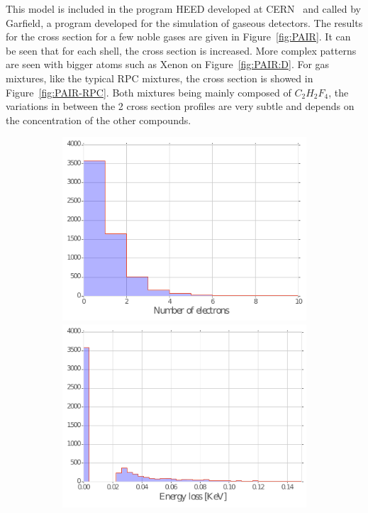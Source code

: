 	This model is included in the program HEED developed at CERN~\cite{HEED} and called by Garfield, a program developed for the simulation of gaseous detectors. The results for the cross section for a few noble gases are given in Figure~\ref{fig:PAIR}. It can be seen that for each shell, the cross section is increased. More complex patterns are seen with bigger atoms such as Xenon on Figure~\ref{fig:PAIR:D}. For gas mixtures, like the typical RPC mixtures, the cross section is showed in Figure~\ref{fig:PAIR-RPC}. Both mixtures being mainly composed of $C_2H_2F_4$, the variations in between the 2 cross section profiles are very subtle and depends on the concentration of the other compounds.
	
	\begin{figure}[H]
		\begin{subfigure}{\linewidth}
			\centering
			\includegraphics[width = 0.5\plotwidth]{fig/chapt4/N_elec_Helium.pdf}
			\includegraphics[width = 0.5\plotwidth]{fig/chapt4/E_loss_Helium.pdf}

\end{subfigure}
\end{figure}
